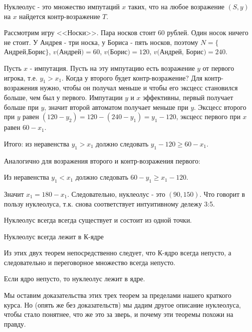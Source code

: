 \begin{mydef}
Нуклеолус  - это множество импутаций $x$ таких, что на любое возражение $(S,y)$ на $x$ найдется контр-возражение $T$.
\end{mydef}


\begin{myex} Рассмотрим игру <<Носки>>. Пара носков стоит 60 рублей. Один носок ничего не стоит. У Андрея - три носка, у Бориса - пять носков, поэтому $N=\{$Андрей,Борис$\}$, $v($Андрей$)=60$, $v($Борис$)=120$, $v($Андрей, Борис$)=240$. 

Пусть $x$ - импутация. Пусть на эту импутацию есть возражение $y$ от первого игрока, т.е. $y_{1}>x_{1}$. Когда у второго будет контр-возражение? Для контр-возражения нужно, чтобы он получал меньше и чтобы его эксцесс становился больше, чем был у первого. Импутации $y$ и $x$ эффективны, первый получает больше при $y$, значит второй автоматом получает меньше при $y$. Эксцесс второго при $y$ равен $(120-y_{2})=120-(240-y_{1})=y_{1}-120$, эксцесс первого при $x$ равен $60-x_{1}$.

Итого: из неравенства $y_{1}>x_{1}$ должно следовать $y_{1}-120\geq 60-x_{1}$.

Аналогично для возражения второго и контр-возражения первого:

Из неравенства $y_{1}<x_{1}$ должно следовать $60-y_{1}\geq x_{1}-120$.

Значит $x_{1}=180-x_{1}$. Следовательно, нуклеолус - это $(90,150)$. Что говорит в пользу нуклеолуса, т.к. снова соответствует интуитивному дележу 3:5.
\end{myex}

\begin{myth}
Нуклеолус всегда всегда существует и состоит из одной точки.
\end{myth}

\begin{myth}
Нуклеолус всегда лежит в К-ядре
\end{myth}

Из этих двух теорем непосредственно следует, что К-ядро всегда непусто, а следовательно и переговорное множество всегда непусто.

\begin{myth}
Если ядро непусто, то нуклеолус лежит в ядре.
\end{myth}

Мы оставим доказательства этих трех теорем за пределами нашего краткого курса. Но (опять же без доказательств) мы дадим другое описание нуклеолуса, чтобы стало понятнее, что же это за зверь, и почему эти теоремы похожи на правду.

